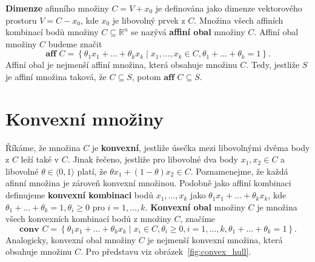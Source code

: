 \noindent \textbf{Dimenze} afinního množiny $C = V + x_0$ je definována jako dimenze vektorového prostoru $V = C - x_0$, kde $x_0$ je libovolný prvek z $C$. Množina všech affiních kombinací bodů množiny $C \subseteq \mathbb{R}^n$ se nazývá \textbf{affiní obal} množiny $C$. Affiní obal množiny $C$ budeme značit
$$
    \textbf{aff } C = \left\{ \theta_1 x_1 + \dots + \theta_k x_k \mid x_1, \dots, x_k \in C, \theta_1 + \dots + \theta_k = 1 \right\}.
$$
Affiní obal je nejmenší affiní množina, která obsahuje množinu $C$. Tedy, jestliže $S$ je affiní množina taková, že $C \subseteq S$, potom $\textbf{aff }C \subseteq S$.


\section{Konvexní množiny}

Říkáme, že množina $C$ je \textbf{konvexní}, jestliže úsečka mezi libovolnými dvěma body z $C$ leží také v $C$. Jinak řečeno, jestliže pro libovolné dva body $x_1, x_2 \in C$ a libovolné $\theta \in \langle 0, 1 \rangle$ platí, že $\theta x_1 + (1 - \theta) x_2 \in C$. Poznamenejme, že každá afinní množina je zároveň konvexní množinou. Podobně jako affiní kombinaci definujeme \textbf{konvexní kombinaci} bodů $x_1, \dots, x_k$ jako $\theta_1 x_1 + \dots + \theta_k x_k$, kde $\theta_1 + \dots + \theta_k = 1, \theta_i \geq 0$ pro $i = 1, \dots, k$. \textbf{Konvexní obal} množiny $C$ je množina všech konvexních kombinací bodů z množiny $C$, značíme
$$
    \textbf{conv }C = \left\{ \theta_1 x_1 + \dots + \theta_k x_k \mid x_i \in C, \theta_i \geq 0, i = 1, \dots, k, \theta_1 + \dots + \theta_k = 1 \right\}.
$$
Analogicky, konvexní obal množiny $C$ je nejmenší konvexní množina, která obsahuje množinu $C$. Pro představu viz obrázek~\ref{fig:convex_hull}.

